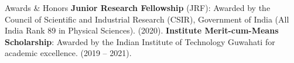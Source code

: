 \begin{rubric}{Awards \& Honors}
%
\entry*[] \textbf{Junior Research Fellowship} (JRF): Awarded by the Council of Scientific and Industrial Research (CSIR), Government of India (All India Rank 89 in Physical Sciences). (2020).
%
%
%
\entry*[] \textbf{Institute Merit-cum-Means Scholarship}: Awarded by the Indian Institute of Technology Guwahati for academic excellence. (2019 -- 2021).
%


\end{rubric}
